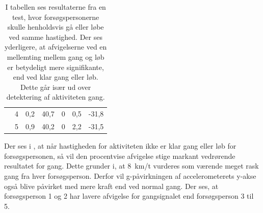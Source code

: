 \begin{table}[H]
{\begin{tabular}{ccccccc}
		& 4                                                                                                      & 0,2  & 40,7                                                                                            & 0     & 0,5   & -31,8                                                                                             \\
		& 5                                                                                                    & 0,9     & 40,2                                                                                           & 0         & 2,2 & -31,5  \\ \hline 
		\end{tabular}
	}
	\caption{I tabellen ses resultaterne fra en test, hvor forsøgspersonerne skulle henholdsvis gå eller løbe ved samme hastighed. Der ses yderligere, at afvigelserne ved en mellemting mellem gang og løb er betydeligt mere signifikante, end ved klar gang eller løb. Dette går især ud over detektering af aktiviteten gang.}
	\label{tab:samletsys_8kmt}
\end{table}\vspace{-.25cm}
Der ses i , at når hastigheden for aktiviteten ikke er klar gang eller løb for forsøgspersonen, så vil den procentvise afvigelse stige markant vedrørende resultatet for gang. Dette grunder i, at 8~km/t vurderes som værende meget rask gang fra hver forsøgsperson. Derfor vil g-påvirkningen af accelerometerets y-akse også blive påvirket med mere kraft end ved normal gang. Der ses, at forsøgsperson 1 og 2 har lavere afvigelse for gangsignalet end forsøgsperson 3 til 5.

